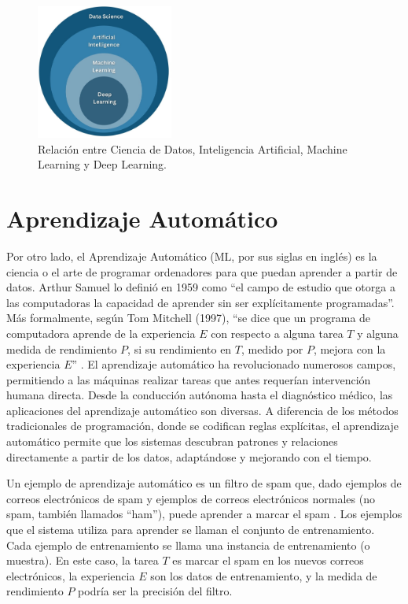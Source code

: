 \begin{figure}[h!]
    \centering
    \includegraphics[width=0.4\textwidth]{img/ia.jpg}
    \caption{Relación entre Ciencia de Datos, Inteligencia Artificial, Machine Learning y Deep Learning.}
    \label{fig: ia}
\end{figure}


\section{Aprendizaje Automático}

Por otro lado, el Aprendizaje Automático (ML, por sus siglas en inglés) es la ciencia o el arte de programar ordenadores para que puedan aprender a partir de datos. Arthur Samuel lo definió en 1959 como ``el campo de estudio que otorga a las computadoras la capacidad de aprender sin ser explícitamente programadas''. Más formalmente, según Tom Mitchell (1997), ``se dice que un programa de computadora aprende de la experiencia \(E\) con respecto a alguna tarea \(T\) y alguna medida de rendimiento \(P\), si su rendimiento en \(T\), medido por \(P\), mejora con la experiencia \(E\)'' \citep{geron2022hands}. El aprendizaje automático ha revolucionado numerosos campos, permitiendo a las máquinas realizar tareas que antes requerían intervención humana directa. Desde la conducción autónoma hasta el diagnóstico médico, las aplicaciones del aprendizaje automático son diversas. A diferencia de los métodos tradicionales de programación, donde se codifican reglas explícitas, el aprendizaje automático permite que los sistemas descubran patrones y relaciones directamente a partir de los datos, adaptándose y mejorando con el tiempo.



Un ejemplo de aprendizaje automático es un filtro de spam que, dado ejemplos de correos electrónicos de spam y ejemplos de correos electrónicos normales (no spam, también llamados ``ham''), puede aprender a marcar el spam \citep{geron2022hands}. Los ejemplos que el sistema utiliza para aprender se llaman el conjunto de entrenamiento. Cada ejemplo de entrenamiento se llama una instancia de entrenamiento (o muestra). En este caso, la tarea \(T\) es marcar el spam en los nuevos correos electrónicos, la experiencia \(E\) son los datos de entrenamiento, y la medida de rendimiento \(P\) podría ser la precisión del filtro.

